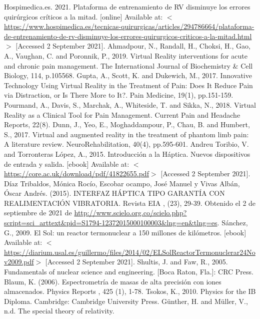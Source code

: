 \begin{thebibliography}{2}
	 Hospimedica.es. 2021. Plataforma de entrenamiento de RV disminuye los errores quirúrgicos críticos a la mitad. [online] Available at: $<$\href{https://www.hospimedica.es/tecnicas-quirurgicas/articles/294786664/plataforma-de-entrenamiento-de-rv-disminuye-los-errores-quirurgicos-criticos-a-la-mitad.html}{https://www.hospimedica.es/tecnicas-quirurgicas/articles/294786664/plataforma-de-entrenamiento-de-rv-disminuye-los-errores-quirurgicos-criticos-a-la-mitad.html}$>$ [Accessed 2 September 2021].
	 Ahmadpour, N., Randall, H., Choksi, H., Gao, A., Vaughan, C. and Poronnik, P., 2019. Virtual Reality interventions for acute and chronic pain management. The International Journal of Biochemistry \& Cell Biology, 114, p.105568.
	 Gupta, A., Scott, K. and Dukewich, M., 2017. Innovative Technology Using Virtual Reality in the Treatment of Pain: Does It Reduce Pain via Distraction, or Is There More to It?. Pain Medicine, 19(1), pp.151-159.
	 Pourmand, A., Davis, S., Marchak, A., Whiteside, T. and Sikka, N., 2018. Virtual Reality as a Clinical Tool for Pain Management. Current Pain and Headache Reports, 22(8).
	 Dunn, J., Yeo, E., Moghaddampour, P., Chau, B. and Humbert, S., 2017. Virtual and augmented reality in the treatment of phantom limb pain: A literature review. NeuroRehabilitation, 40(4), pp.595-601.
	 Andreu Toribio, V. and Torronteras López, A., 2015. Introducción a la Háptica. Nuevos dispositivos de entrada y salida. [ebook] Available at: $<$\url{https://core.ac.uk/download/pdf/41822655.pdf}$>$ [Accessed 2 September 2021].
	 Díaz Tribaldos, Mónica Rocío, Escobar ocampo, José Manuel y Vivas Albán, Óscar Andrés. (2015). INTERFAZ HÁPTICA TIPO GARANTÍA CON REALIMENTACIÓN VIBRATORIA. Revista EIA , (23), 29-39. Obtenido el 2 de septiembre de 2021 de \url{http://www.scielo.org.co/scielo.php?script=sci\_arttext\&pid=S1794-12372015000100003\&lng=en\&tlng=es}.
	 Sánchez, G., 2009. El Sol: un reactor termonuclear a 150 millones de kilómetros. [ebook] Available at: $<$\url{https://diarium.usal.es/guillermo/files/2014/02/ELSolReactorTermonuclerar24Nov2009.pdf}$>$ [Accessed 2 September 2021].
	 Shultis, J. and Faw, R., 2005. Fundamentals of nuclear science and engineering. [Boca Raton, Fla.]: CRC Press.
	 Blaum, K. (2006). Espectrometría de masas de alta precisión con iones almacenados. Physics Reports , 425 (1), 1-78.
	 Tsokos, K., 2010. Physics for the IB Diploma. Cambridge: Cambridge University Press.
	 Günther, H. and Müller, V., n.d. The special theory of relativity.

\end{thebibliography}
